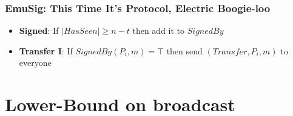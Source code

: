         \begin{frame}
            \frametitle{EmuSig: This Time It's Protocol, Electric Boogie-loo}
                \begin{itemize}
                    \item \textbf{Signed}: If $|HasSeen| \geq n-t$ then add it to $SignedBy$
                    \item \textbf{Transfer I}: If $SignedBy(P_i, m) = \top$ then send $(Transfer, P_i, m)$ to everyone
                \end{itemize}
            
        
        \end{frame}


\section{Lower-Bound on broadcast}






